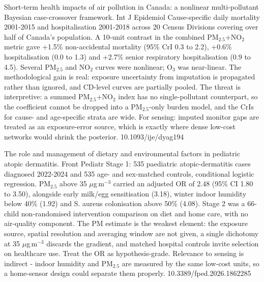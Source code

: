 \documentclass[10pt]{article}
\begin{document}

{Short-term health impacts of air pollution in Canada: a nonlinear multi-pollutant Bayesian case-crossover framework.}
{Int J Epidemiol}
{Cause-specific daily mortality 2001-2015 and hospitalisation 2001-2018 across 20 Census Divisions covering over half of Canada's population. A 10-unit contrast in the combined PM$_{2.5}$+NO$_2$ metric gave +1.5\% non-accidental mortality (95\% CrI 0.3 to 2.2), +0.6\% hospitalisation (0.0 to 1.3) and +2.7\% senior respiratory hospitalisation (0.9 to 4.5). Several PM$_{2.5}$ and NO$_2$ curves were nonlinear; O$_3$ was near-linear. The methodological gain is real: exposure uncertainty from imputation is propagated rather than ignored, and CD-level curves are partially pooled. The threat is interpretive: a summed PM$_{2.5}$+NO$_2$ index has no single-pollutant counterpart, so the coefficient cannot be dropped into a PM$_{2.5}$-only burden model, and the CrIs for cause- and age-specific strata are wide. For sensing: imputed monitor gaps are treated as an exposure-error source, which is exactly where dense low-cost networks would shrink the posterior.}
{10.1093/ije/dyag194}

{The role and management of dietary and environmental factors in pediatric atopic dermatitis.}
{Front Pediatr}
{Stage 1: 535 paediatric atopic-dermatitis cases diagnosed 2022-2024 and 535 age- and sex-matched controls, conditional logistic regression. PM$_{2.5}$ above 35 $\mu$g\,m$^{-3}$ carried an adjusted OR of 2.48 (95\% CI 1.80 to 3.50), alongside early milk/egg sensitisation (3.18), winter indoor humidity below 40\% (1.92) and S. aureus colonisation above 50\% (4.08). Stage 2 was a 66-child non-randomised intervention comparison on diet and home care, with no air-quality component. The PM estimate is the weakest element: the exposure source, spatial resolution and averaging window are not given, a single dichotomy at 35 $\mu$g\,m$^{-3}$ discards the gradient, and matched hospital controls invite selection on healthcare use. Treat the OR as hypothesis-grade. Relevance to sensing is indirect - indoor humidity and PM$_{2.5}$ are measured by the same low-cost units, so a home-sensor design could separate them properly.}
{10.3389/fped.2026.1862285}
\end{document}
